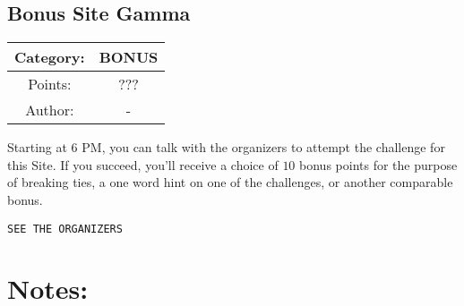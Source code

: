 \begin{center}
\section*{Bonus Site Gamma}
{\large
\begin{tabular}{| c c |}
\hline
Category: & BONUS\\\hline
Points: & ???\\\hline
Author: & -\\\hline
\end{tabular}
}
\end{center}
\vspace{0.5in}

{\large
Starting at 6 PM, you can talk with the organizers to attempt the challenge for this Site. If you succeed, you'll receive a choice of $10$ bonus points for the purpose of breaking ties, a one word hint on one of the challenges, or another comparable bonus.
}
\vspace{0.25in}
\begin{center}
  {\Large\tt SEE THE ORGANIZERS}
\end{center}

\vspace{0.25in}
\section*{Notes:}
